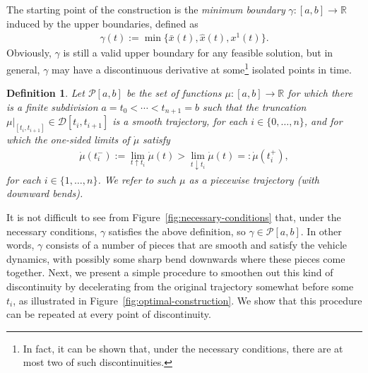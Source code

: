 \documentclass[a4paper]{article}
\theoremstyle{definition}
\theoremstyle{plain}
\newtheorem{define}{Definition\hspace{0.25em}\ignorespaces}
\begin{document}
The starting point of the construction is the \emph{minimum boundary}
$\gamma : [a,b] \rightarrow \mathbb{R}$ induced by the upper boundaries, defined as
\begin{align}\label{eq:min-boundary}
  \gamma(t) := \min \{ \bar{x}(t), \hat{x}(t), x^{1}(t) \} .
\end{align}
%
Obviously, $\gamma$ is still a valid upper boundary for any feasible solution,
%
but in general, $\gamma$ may have a discontinuous derivative at some\footnote{In fact, it can be shown that, under the necessary conditions, there are at most two of such discontinuities.} isolated
points in time.

\begin{define}\label{def:piecewise-trajectory}
  Let $\mathcal{P}[a,b]$ be the set of functions $\mu : [a, b] \rightarrow \mathbb{R}$ for
  which there is a finite subdivision $a = t_{0} < \cdots < t_{n+1} = b$ such that
  the truncation $\mu|_{[t_{i}, t_{i+1}]} \in \mathcal{D}[t_{i}, t_{i+1}]$ is
  a smooth trajectory, for each $i \in \{0, \dots, n\}$, and for which the one-sided limits of $\dot{\mu}$ satisfy
  \begin{align}
    \dot{\mu}(t_{i}^{-}) := \lim_{t \uparrow t_{i}} \dot{\mu}(t) > \lim_{t \downarrow t_{i}} \dot{\mu}(t) =: \dot{\mu}(t_{i}^{+}) ,
  \end{align}
  for each $i \in \{1, \dots, n\}$. We refer to such $\mu$ as a \emph{piecewise
    trajectory (with downward bends)}.
\end{define}

It is not difficult to see from Figure~\ref{fig:necessary-conditions} that,
under the necessary conditions, $\gamma$ satisfies the above definition, so
$\gamma \in \mathcal{P}[a,b]$. In other words, $\gamma$ consists of a number of
pieces that are smooth and satisfy the vehicle dynamics, with possibly some
sharp bend downwards where these pieces come together.
%
Next, we present a simple procedure to smoothen out this kind of discontinuity
by decelerating from the original trajectory somewhat before some $t_{i}$, as
illustrated in Figure~\ref{fig:optimal-construction}. We show that this procedure can be repeated at every
point of discontinuity.
\end{document}
